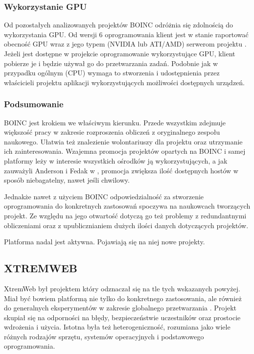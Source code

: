 \documentclass[12pt,a4paper,twoside]{article}
\begin{document}
\subsubsection{Wykorzystanie GPU}

Od pozostałych analizowanych projektów BOINC odróżnia się zdolnością do wykorzystania GPU. Od wersji 6 oprogramowania klient jest w stanie raportować obecność GPU wraz z jego typem (NVIDIA lub ATI/AMD) serwerom projektu \cite{boincgpu}. Jeżeli jest dostępne w projekcie oprogramowanie wykorzystujące GPU, klient pobierze je i będzie używał go do przetwarzania zadań. Podobnie jak w przypadku ogólnym (CPU) wymaga to stworzenia i udostępnienia przez właścicieli projektu aplikacji wykorzystujących możliwości dostępnych urządzeń.

\subsubsection{Podsumowanie}

BOINC jest krokiem we właściwym kierunku. Przede wszystkim zdejmuje większość pracy w zakresie rozproszenia obliczeń z oryginalnego zespołu naukowego. Ułatwia też znalezienie wolontariuszy dla projektu oraz utrzymanie ich zainteresowania. Wzajemna promocja projektów opartych na BOINC i samej platformy leży w interesie wszystkich ośrodków ją wykorzystujących, a jak zauważyli Anderson i Fedak w \cite{computational}, promocja zwiększa ilość dostępnych hostów w sposób niebagatelny, nawet jeśli chwilowy.

Jednakże nawet z użyciem BOINC odpowiedzialność za stworzenie oprogramowania do konkretnych zastosowań spoczywa na naukowcach tworzących projekt. Ze względu na jego otwartość dotyczą go też problemy z redundantnymi obliczeniami oraz z upublicznianiem dużych ilości danych dotyczących projektów.

Platforma nadal jest aktywna. Pojawiają się na niej nowe projekty.

\subsection{XTREMWEB}

XtremWeb był projektem który odznaczał się na tle tych wskazanych powyżej. Miał być bowiem platformą nie tylko do konkretnego zastosowania, ale również do generalnych eksperymentów w zakresie globalnego przetwarzania \cite{xtremweb}. Projekt skupiał się na odporności na błędy, bezpieczeństwie uczestników oraz prostocie wdrożenia i użycia. Istotna była też heterogeniczność, rozumiana jako wiele różnych rodzajów sprzętu, systemów operacyjnych i podstawowego oprogramowania.
\end{document}
